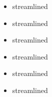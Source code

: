 

\subtitle{2023 beta 2 hotfix 1}

\begin{multicols}{2}
	\begin{itemize}
		\item \powershroom {} streamlined
	\end{itemize}
\end{multicols}

\subtitle{2023 beta 2}

\begin{multicols}{2}
	\begin{itemize}
		\item \mikinokstotem{} streamlined
		\item \crownofthecavernking{}  streamlined
		\item\smashemflat{}  streamlined
		\item\pursuitmode{}  streamlined
		\item\bigbrother{}  streamlined
	\end{itemize}
	\end{multicols}

